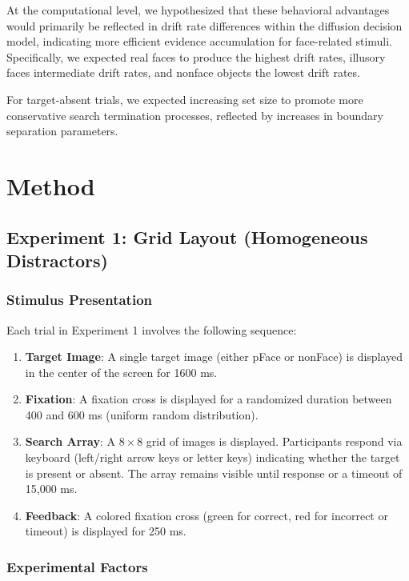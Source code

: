 \documentclass[stu,12pt,floatsintext]{apa7}
\begin{document}
At the computational level, we hypothesized that these behavioral advantages would primarily be reflected in drift rate differences within the diffusion decision model, indicating more efficient evidence accumulation for face-related stimuli. Specifically, we expected real faces to produce the highest drift rates, illusory faces intermediate drift rates, and nonface objects the lowest drift rates.

For target-absent trials, we expected increasing set size to promote more conservative search termination processes, reflected by increases in boundary separation parameters.

\section{Method}

\subsection{Experiment 1: Grid Layout (Homogeneous Distractors)}

\subsubsection{Stimulus Presentation}

Each trial in Experiment 1 involves the following sequence:

\begin{enumerate}
    \item \textbf{Target Image}: A single target image (either pFace or nonFace) is displayed in the center of the screen for 1600 ms.
    \item \textbf{Fixation}: A fixation cross is displayed for a randomized duration between 400 and 600 ms (uniform random distribution).
    \item \textbf{Search Array}: A $8 \times 8$ grid of images is displayed. Participants respond via keyboard (left/right arrow keys or letter keys) indicating whether the target is present or absent. The array remains visible until response or a timeout of 15,000 ms.
    \item \textbf{Feedback}: A colored fixation cross (green for correct, red for incorrect or timeout) is displayed for 250 ms.
\end{enumerate}

\subsubsection{Experimental Factors}
\end{document}
